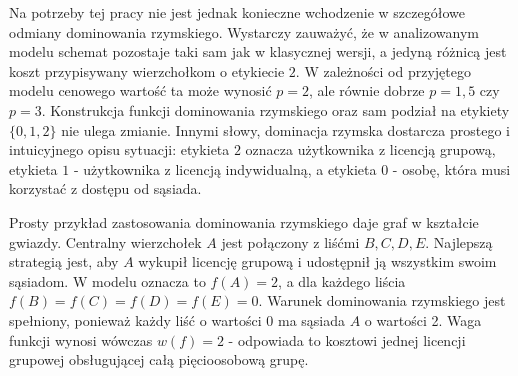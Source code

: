 Na potrzeby tej pracy nie jest jednak konieczne wchodzenie w szczegółowe odmiany dominowania rzymskiego. Wystarczy zauważyć, że w analizowanym modelu schemat pozostaje taki sam jak w klasycznej wersji, a jedyną różnicą jest koszt przypisywany wierzchołkom o etykiecie $2$. W zależności od przyjętego modelu cenowego wartość ta może wynosić $p=2$, ale równie dobrze $p=1{,}5$ czy $p=3$. Konstrukcja funkcji dominowania rzymskiego oraz sam podział na etykiety $\{0,1,2\}$ nie ulega zmianie. Innymi słowy, dominacja rzymska dostarcza prostego i intuicyjnego opisu sytuacji: etykieta $2$ oznacza użytkownika z licencją grupową, etykieta $1$ - użytkownika z licencją indywidualną, a etykieta $0$ - osobę, która musi korzystać z dostępu od sąsiada.



Prosty przykład zastosowania dominowania rzymskiego daje graf w kształcie gwiazdy. Centralny wierzchołek $A$ jest połączony z liśćmi $B, C, D, E$. Najlepszą strategią jest, aby $A$ wykupił licencję grupową i udostępnił ją wszystkim swoim sąsiadom. W modelu oznacza to $f(A)=2$, a dla każdego liścia $f(B)=f(C)=f(D)=f(E)=0$. Warunek dominowania rzymskiego jest spełniony, ponieważ każdy liść o wartości 0 ma sąsiada $A$ o wartości 2. Waga funkcji wynosi wówczas $w(f)=2$ - odpowiada to kosztowi jednej licencji grupowej obsługującej całą pięcioosobową grupę.

